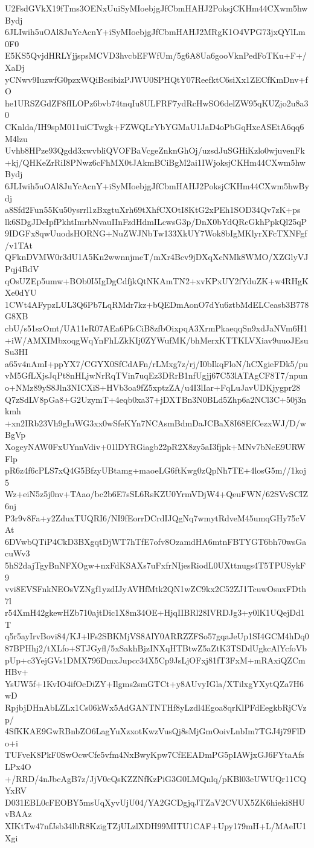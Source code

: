 U2FsdGVkX19fTms3OENxUuiSyMIoebjgJfCbmHAHJ2PoksjCKHm44CXwm5hwBydj
6JLIwih5uOAl8JuYcAcnY+iSyMIoebjgJfCbmHAHJ2MRgK1O4VPG73jxQYlLm0F0
E5KS5QvjdHRLYjjspsMCVD3hvcbEFWfUm/5g6A8Ua6gooVknPedFoTKu+F+/XaDj
yCNwv9IuzwfG0pzxWQiBcsibizPJWU0SPHQtY07ReefktC6siXx1ZECfKmDnv+fO
he1URSZGdZF8fILOPz6bvb74tnqIu8ULFRF7ydRcHwSO6delZW95qKUZjo2u8a30
CKnlda/IH9spM011uiCTwgk+FZWQLrYbYGMaU1JaD4oPbGqHxeASEtA6qq6M4lzu
Uvhb8HPze93Qgdd3xwvbliQVOFBaVcgeZnknGhOj/uzsdJuSGHiKzlo0wjuvenFk
+kj/QHKeZrRiI8PNwz6cFhMX0tJAkmBCiBgM2ai1IWjoksjCKHm44CXwm5hwBydj
6JLIwih5uOAl8JuYcAcnY+iSyMIoebjgJfCbmHAHJ2PoksjCKHm44CXwm5hwBydj
a8Sfd2Fun55Ku50ysrrl1zBxgtuXrh69tXhfCXOtI8KtG2xPEh1SOD34Qv7zK+ps
lk6SDgJDeIpfPkhtImrbNvauIInFzdHdmILcwsG3p/DnX0bYdQRcGkhPpkQl25qP
9IDGFx8qwUuodsHORNG+NuZWJNbTw133XkUY7Wok8bIgMKlyrXFcTXNFgf/v1TAt
QFknDVMW0r3dU1A5Kn2wwnnjmeT/mXr4Bcv9jDXqXcNMk8WMO/XZGlyVJPqj4BdV
qOsUZEp5umw+BOb0I5IgDgCdfjkQtNKAmTN2+xvKPxUY2fYduZK+w4RHgKXe0dYU
1CWt4AFypzLUL3Q6Pb7LqRMdr7kz+bQEDmAonO7dYu6ztbMdELCeasb3B778G8XB
cbU/s51szOmt/UA11eR07AEa6PfsCiB8zfbOixpqA3XrmPkaeqqSn9xdJaNVm6H1
+iW/AMXIMbxoqgWqYnFhLZkKIj0ZYWufMK/bhMerxKTTKLVXiav9uuoJEsuSu3HI
a65v4nAmI+ppYX7/CGYX0SfCdAFn/rLMxg7z/rj/I0bIkqFloN/hCXgieFDk5/pu
vM5GfLXjsJqPt8nHLjwNrRqTVin7uqEz3DRrB1nfUgjj67C53lATAgCF8T7/npun
o+NMz89yS8Jln3NICXiS+HVb3oa9fZ5xptzZA/u4I3lIar+FqLuJavUDKjygpr28
Q7zSdLV8pGa8+G2UzymT+4eqb0xa37+jDXTBn3N0BLd5Zhp6a2NCl3C+50j3nkmh
+xn2IRb23Vh9gIuWG3xx0wSfeKYn7NCAsmBdmDaJCBaX8I68EfCezxWJ/D/wBgVp
XogeyNAW0FxUYnnVdiv+01lDYRGiagb22pR2X8zy5aI3fjpk+MNv7bNcE9URWFlp
pR6z4f6cPLS7xQ4G5BfzyUBtamg+maoeLG6ftKwg0zQpNh7TE+4losG5m//1koj5
Wz+eiN5z5j0nv+TAao/bc2b6E7sSL6RsKZU0YrmVDjW4+QeuFWN/62SVvSCIZ6nj
P3r9v8Fa+y2ZduxTUQRI6/NI9fEorrDCrdIJQgNq7wmytRdveM45umqGHy75cVAt
6DVwbQTiP4CkD3BXgqtDjWT7hTfE7ofv8OzamdHA6mtnFBTYGT6bh70wsGacuWv3
5hS2dajTgyBnNFXOgw+nxFdKSAXs7uFxfrNIjesRiodL0UXttnugs4T5TPUSykF9
vvi8EVSFnkNEOsVZNgf1yzdIJyAVHfMtk2QN1wZC9kx2C52ZJ1TcuwOsuxFDth7l
r54XmH42gkewHZb710ajtDic1X8m34OE+HjqIIBRl28IVRDJg3+y0lK1UQejDd1T
q5r5ayIrvBovi84/KJ+lFs2SBKMjVS8AlY0ARRZZFSo57gqaJeUp1SI4GCM4hDq0
87BPHhj2/tXLfo+STJGyfl/5xSakhBjzINXqHTBtwZ5aZtK3TSDdUgkcAlYcfoVb
pUp+c3YejGVs1DMX796DmxJupcc34X5Cp9JsLjOFxj81fT3FxM+mRAxiQZCmHBv+
YsUW5f+1KvIO4ifOcDiZY+Ilgms2smGTCt+y8AUvyIGla/XTilxgYXytQZa7H6wD
RpjbjDHnAbLZLx1Cs06kWx5AdGANTNTHf8yLzdl4Egoa8qrKlPFdEegkbRjCVzp/
4SfKKAE9GwRBnbZO6LagYuXzxotKwzVusQj8sMjGmOoivLnbIm7TGJ4j79FlDo+i
TUFveK8PkF0SwOcwCfe5vfm4NxBwyKpw7CfEEADmPG5pIAWjxGJ6FYtaAfsLPx4O
+/RRD/4nJbcAgB7z/JjV0cQsKZZNfKzPiG3G0LMQnlq/pKBl03eUWUQr11CQYxRV
D031EBL0cFEOBY5msUqXyvUjU04/YA2GCDgjqJTZaV2CVUX5ZK6hieki8HUvBAAz
XIKtTw47nfJsb34lbR8KzigTZjULzlXDH99MITU1CAF+Upy179mH+L/MAeIU1Xgi
